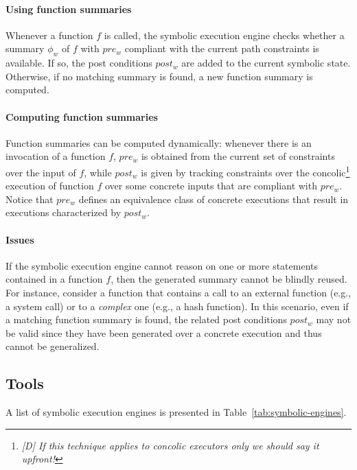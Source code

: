 \paragraph{Using function summaries} Whenever a function $f$ is called, the symbolic execution engine checks whether a summary $\phi_w$ of $f$ with $pre_w$ compliant with the current path constraints is available. If so, the post conditions $post_w$ are added to the current symbolic state. Otherwise, if no matching summary is found, a new function summary is computed.

\paragraph{Computing function summaries} Function summaries can be computed dynamically: whenever there is an invocation of a function $f$, $pre_w$ is obtained from the current set of constraints over the input of $f$, while $post_w$ is given by tracking constraints over the concolic\footnote{{\em [D] If this technique applies to concolic executors only we should say it upfront!}} execution of function $f$ over some concrete inputs that are compliant with $pre_w$. Notice that $pre_w$ defines an equivalence class of concrete executions that result in executions characterized by $post_w$. 

\paragraph{Issues} If the symbolic execution engine cannot reason on one or more statements contained in a function $f$, then the generated summary cannot be blindly reused. For instance, consider a function that contains a call to an external function (e.g., a system call) or to a {\em complex} one (e.g., a hash function). In this scenario, even if a matching function summary is found, the related post conditions $post_w$ may not be valid since they have been generated over a concrete execution and thus cannot be generalized. %


\subsection{Tools}
A list of symbolic execution engines is presented in Table~\ref{tab:symbolic-engines}.

